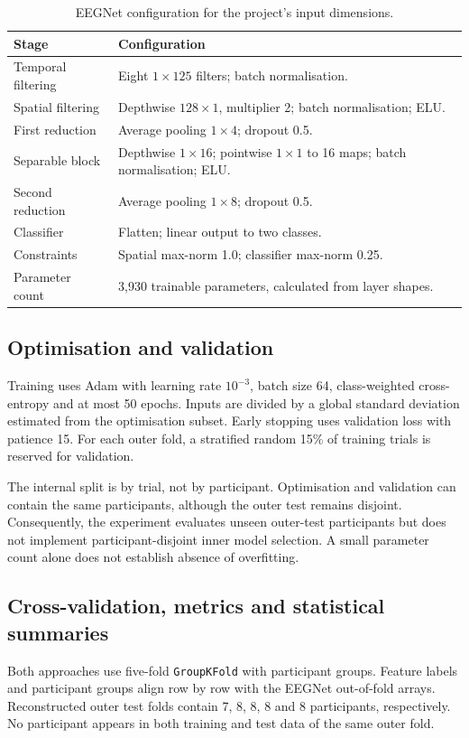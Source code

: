 \documentclass[11pt,a4paper]{article}
\newcommand{\code}[1]{\nolinkurl{#1}}
\begin{document}
\begin{table}[htbp]\centering
\small
\caption{EEGNet configuration for the project's input dimensions.}
\label{tab:architecture}
\begin{tabularx}{\linewidth}{lY}
\toprule
Stage & Configuration\\\midrule
Temporal filtering & Eight $1\times125$ filters; batch normalisation.\\
Spatial filtering & Depthwise $128\times1$, multiplier 2; batch normalisation; ELU.\\
First reduction & Average pooling $1\times4$; dropout 0.5.\\
Separable block & Depthwise $1\times16$; pointwise $1\times1$ to 16 maps; batch normalisation; ELU.\\
Second reduction & Average pooling $1\times8$; dropout 0.5.\\
Classifier & Flatten; linear output to two classes.\\
Constraints & Spatial max-norm 1.0; classifier max-norm 0.25.\\
Parameter count & 3,930 trainable parameters, calculated from layer shapes.\\\bottomrule
\end{tabularx}
\end{table}

\subsection{Optimisation and validation}
Training uses Adam with learning rate $10^{-3}$, batch size 64, class-weighted cross-entropy and at most 50 epochs. Inputs are divided by a global standard deviation estimated from the optimisation subset. Early stopping uses validation loss with patience 15. For each outer fold, a stratified random 15\% of training trials is reserved for validation.

The internal split is by trial, not by participant. Optimisation and validation can contain the same participants, although the outer test remains disjoint. Consequently, the experiment evaluates unseen outer-test participants but does not implement participant-disjoint inner model selection. A small parameter count alone does not establish absence of overfitting.

\subsection{Cross-validation, metrics and statistical summaries}
Both approaches use five-fold \code{GroupKFold} with participant groups. Feature labels and participant groups align row by row with the EEGNet out-of-fold arrays. Reconstructed outer test folds contain 7, 8, 8, 8 and 8 participants, respectively. No participant appears in both training and test data of the same outer fold.
\end{document}
